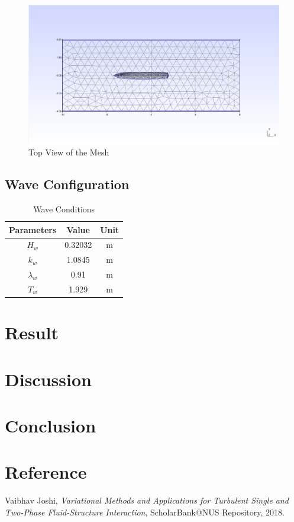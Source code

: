 \documentclass[12pt]{article} %
\begin{document}
\begin{figure}[h]
    \centering
    \includegraphics[width=1\textwidth]{Mesh_4.png}
    \caption{Top View of the Mesh}
\end{figure}
\clearpage
\subsection{Wave Configuration}
\begin{table}[ht]
    \caption{Wave Conditions}
    \centering
    \begin{tabular}{|c|c|c|}
        \hline
        Parameters & Value & Unit\\
        \hline   
        $H_w$ & 0.32032 & m \\
        $k_w$ & 1.0845 & m\\
        $\lambda_w$ & 0.91 & m\\
        $T_w$ & 1.929 & m \\
        \hline
    \end{tabular}
\end{table}


\section{Result}

\section{Discussion}

\section{Conclusion}



\section{Reference}
\begin{thebibliography}{99}
    Vaibhav Joshi, \emph{Variational Methods and Applications for Turbulent Single and Two-Phase Fluid-Structure Interaction}, ScholarBank@NUS Repository, 2018.
\end{thebibliography}
\end{document}
